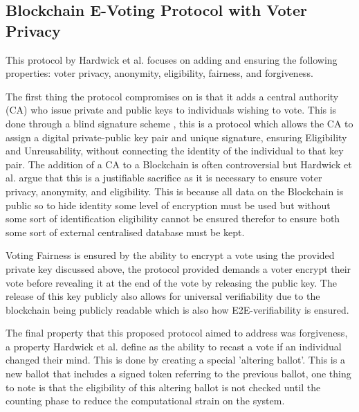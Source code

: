 \documentclass{llncs}
\begin{document}
\subsection{Blockchain E-Voting Protocol with Voter Privacy}
This protocol by Hardwick et al. \cite{mattspaper} focuses on adding and ensuring the following properties: voter privacy, anonymity, eligibility, fairness, and forgiveness.

The first thing the protocol compromises on is that it adds a central authority (CA) who issue private and public keys to individuals wishing to vote. This is done through a blind signature scheme \cite{chaum1983blind}, this is a protocol which allows the CA to assign a digital private-public key pair and unique signature, ensuring Eligibility and Unreusability, without connecting the identity of the individual to that key pair. The addition of a CA to a Blockchain is often controversial but Hardwick et al. argue that this is a justifiable sacrifice as it is necessary to ensure voter privacy, anonymity, and eligibility. This is because all data on the Blockchain is public so to hide identity some level of encryption must be used but without some sort of identification eligibility cannot be ensured therefor to ensure both some sort of external centralised database must be kept. 

Voting Fairness is ensured by the ability to encrypt a vote using the provided private key discussed above, the protocol provided demands a voter encrypt their vote before revealing it at the end of the vote by releasing the public key. The release of this key publicly also allows for universal verifiability due to the blockchain being publicly readable which is also how E2E-verifiability is ensured.

The final property that this proposed protocol aimed to address was forgiveness, a property Hardwick et al. define as the ability to recast a vote if an individual changed their mind. This is done by creating a special 'altering ballot'. This is a new ballot that includes a signed token referring to the previous ballot, one thing to note is that the eligibility of this altering ballot is not checked until the counting phase to reduce the computational strain on the system.
\end{document}
